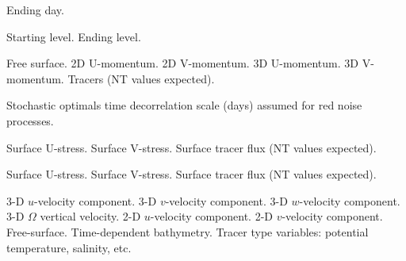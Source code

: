 \begin{klist}
\begin{klist}
        Ending day.
     \end{klist}
    \mbox{}
     \begin{klist}
        Starting level.
        Ending level.
     \end{klist}
    \mbox{}
     \begin{klist}
        Free surface.
        2D U-momentum.
        2D V-momentum.
        3D U-momentum.
        3D V-momentum.
        Tracers (NT values expected).
     \end{klist}
    \mbox{}
     \begin{klist}
         Stochastic optimals time decorrelation
       scale (days) assumed for red noise processes.
     \end{klist}
    \mbox{}
     \begin{klist}
         Surface U-stress.
         Surface V-stress.
        Surface tracer flux (NT values expected).
     \end{klist}
    \mbox{}
     \begin{klist}
        Surface U-stress.
        Surface V-stress.
        Surface tracer flux (NT values
       expected).
     \end{klist}
    \mbox{}
     \begin{klist}
           3-D $u$-velocity component.
           3-D $v$-velocity component.
           3-D $w$-velocity component.
           3-D $\Omega$ vertical velocity.
         2-D $u$-velocity component.
         2-D $v$-velocity component.
            Free-surface.
            Time-dependent bathymetry.
\vspace{2 mm}
            Tracer type variables: potential
    temperature, salinity, etc.
\vspace{2 mm}

\end{klist}
\end{klist}
